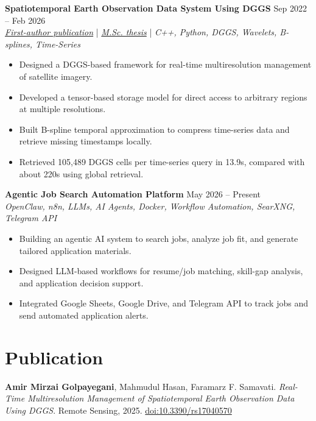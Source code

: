 \documentclass[a4paper,10pt]{article}
\begin{document}
\noindent
\textbf{Spatiotemporal Earth Observation Data System Using DGGS} \hfill Sep 2022 -- Feb 2026 \\
\textit{\href{https://doi.org/10.3390/rs17040570}{First-author publication}} | \textit{\href{https://ucalgary.scholaris.ca/items/114b394b-e516-4732-bd3a-45dd6160d480}{M.Sc. thesis}} | \textit{C++, Python, DGGS, Wavelets, B-splines, Time-Series}
\begin{itemize}[leftmargin=0.25in]
    \item Designed a DGGS-based framework for real-time multiresolution management of satellite imagery.
    \item Developed a tensor-based storage model for direct access to arbitrary regions at multiple resolutions.
    \item Built B-spline temporal approximation to compress time-series data and retrieve missing timestamps locally.
    \item Retrieved 105,489 DGGS cells per time-series query in 13.9s, compared with about 220s using global retrieval.
\end{itemize}

\noindent
\textbf{Agentic Job Search Automation Platform} \hfill May 2026 -- Present \\
\textit{OpenClaw, n8n, LLMs, AI Agents, Docker, Workflow Automation, SearXNG, Telegram API}
\begin{itemize}[leftmargin=0.25in]
    \item Building an agentic AI system to search jobs, analyze job fit, and generate tailored application materials.
    \item Designed LLM-based workflows for resume/job matching, skill-gap analysis, and application decision support.
    \item Integrated Google Sheets, Google Drive, and Telegram API to track jobs and send automated application alerts.
\end{itemize}

\section*{Publication}

\textbf{Amir Mirzai Golpayegani}, Mahmudul Hasan, Faramarz F. Samavati. 
\textit{Real-Time Multiresolution Management of Spatiotemporal Earth Observation Data Using DGGS}. 
Remote Sensing, 2025. \href{https://doi.org/10.3390/rs17040570}{doi:10.3390/rs17040570}

\end{document}
